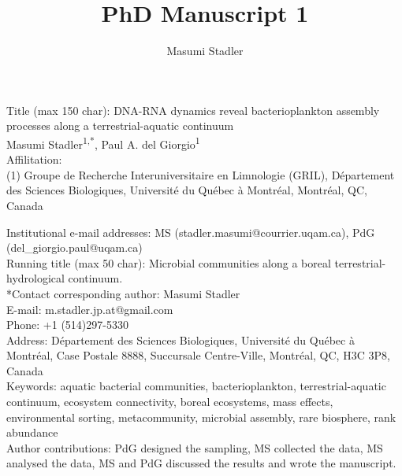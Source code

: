 \documentclass[12pt,a4paper]{article} %
\author{Masumi Stadler}
\title{PhD Manuscript 1}
\begin{document}

\setlength{\parindent}{0cm}
Title (max 150 char): DNA-RNA dynamics reveal bacterioplankton assembly processes along a terrestrial-aquatic continuum\\

Masumi Stadler\textsuperscript{1,*}, Paul A. del Giorgio\textsuperscript{1}\\

Affilitation:\\
(1) Groupe de Recherche Interuniversitaire en Limnologie (GRIL), D\'{e}partement des Sciences Biologiques, Universit\'{e} du Qu\'{e}bec \`{a} Montr\'{e}al, Montr\'{e}al, QC, Canada


Institutional e-mail addresses: MS (stadler.masumi@courrier.uqam.ca), PdG (del\_giorgio.paul@uqam.ca)\\

Running title (max 50 char): Microbial communities along a boreal terrestrial-hydrological continuum.\\

*Contact corresponding author: Masumi Stadler \\
E-mail: m.stadler.jp.at@gmail.com \\
Phone: +1 (514)297-5330 \\
Address: D\'{e}partement des Sciences Biologiques, Universit\'{e} du Qu\'{e}bec \`{a} Montr\'{e}al, Case Postale 8888, Succursale Centre-Ville, Montr\'{e}al, QC, H3C 3P8, Canada \\

Keywords: aquatic bacterial communities, bacterioplankton, terrestrial-aquatic continuum, ecosystem connectivity, boreal ecosystems, mass effects, environmental sorting, metacommunity, microbial assembly, rare biosphere, rank abundance\\

Author contributions: PdG designed the sampling, MS collected the data, MS analysed the data, MS and PdG discussed the results and wrote the manuscript.\\

\newpage

\doublespacing





\setlength{\parindent}{1cm}
\end{document}

